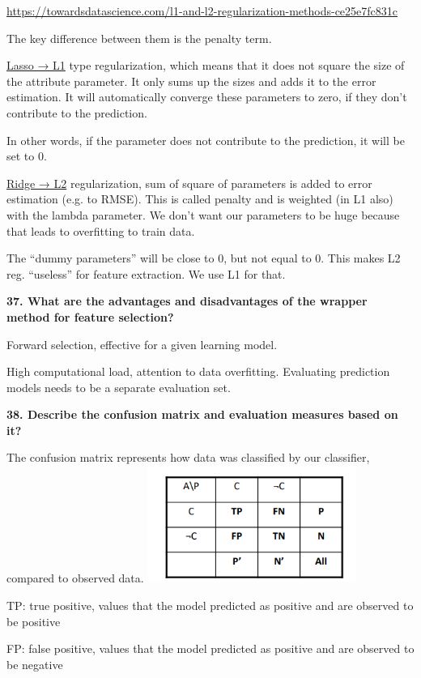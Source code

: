 \href{https://towardsdatascience.com/l1-and-l2-regularization-methods-ce25e7fc831c}{\underline{https://towardsdatascience.com/l1-and-l2-regularization-methods-ce25e7fc831c}}

The key difference between them is the penalty term.

\underline{Lasso → L1} type regularization, which means that it does not
square the size of the attribute parameter. It only sums up the sizes
and adds it to the error estimation. It will automatically converge
these parameters to zero, if they don't contribute to the prediction.

In other words, if the parameter does not contribute to the prediction,
it will be set to 0.

\underline{Ridge → L2} regularization, sum of square of parameters is
added to error estimation (e.g. to RMSE). This is called penalty and is
weighted (in L1 also) with the lambda parameter. We don't want our
parameters to be huge because that leads to overfitting to train data.

The ``dummy parameters'' will be close to 0, but not equal to 0. This
makes L2 reg. ``useless'' for feature extraction. We use L1 for that.

\textbf{37. What are the advantages and disadvantages of the wrapper
method for feature selection?}

Forward selection, effective for a given learning model.

High computational load, attention to data overfitting. Evaluating
prediction models needs to be a separate evaluation set.

\textbf{38. Describe the confusion matrix and evaluation measures based
on it?}

The confusion matrix represents how data was classified by our
classifier, compared to observed data.
\includegraphics[width=2.69271in,height=1.50359in]{media/image17.png}

TP: true positive, values that the model predicted as positive and are
observed to be positive

FP: false positive, values that the model predicted as positive and are
observed to be negative

